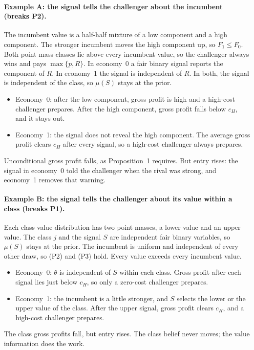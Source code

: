 \paragraph{Example A: the signal tells the challenger about the incumbent (breaks P2).} The incumbent value is a
half-half mixture of a low component and a high component. The stronger incumbent moves the high component up, so
\(F_1\le F_0\). Both point-mass classes lie above every incumbent value, so the challenger always wins and pays
\(\max\{p,R\}\). In economy~0 a fair binary signal reports the component of \(R\). In economy~1 the signal is
independent of \(R\). In both, the signal is independent of the class, so \(\mu(S)\) stays at the prior.
\begin{itemize}[leftmargin=2em]
\item Economy~0: after the low component, gross profit is high and a high-cost challenger prepares. After the high
component, gross profit falls below \(c_H\), and it stays out.
\item Economy~1: the signal does not reveal the high component. The average gross profit clears \(c_H\) after every
signal, so a high-cost challenger always prepares.
\end{itemize}
Unconditional gross profit falls, as Proposition~1 requires. But entry rises: the signal in economy~0 told the
challenger when the rival was strong, and economy~1 removes that warning.

\paragraph{Example B: the signal tells the challenger about its value within a class (breaks P1).} Each class
value distribution has two point masses, a lower value and an upper value. The class \(j\) and the signal \(S\) are
independent fair binary variables, so \(\mu(S)\) stays at the prior. The incumbent is uniform and independent of every
other draw, so (P2) and (P3) hold. Every value exceeds every incumbent value.
\begin{itemize}[leftmargin=2em]
\item Economy~0: \(\theta\) is independent of \(S\) within each class. Gross profit after each signal lies just below
\(c_H\), so only a zero-cost challenger prepares.
\item Economy~1: the incumbent is a little stronger, and \(S\) selects the lower or the upper value of the class. After
the upper signal, gross profit clears \(c_H\), and a high-cost challenger prepares.
\end{itemize}
The class gross profits fall, but entry rises. The class belief never moves; the value information does the work.

